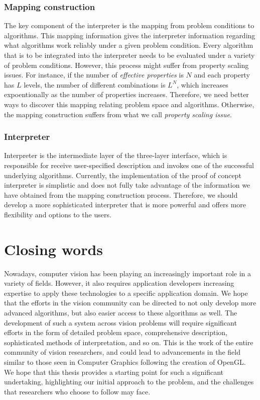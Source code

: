 \subsubsection{Mapping construction}
The key component of the interpreter is the mapping from problem conditions to algorithms. This mapping information gives the interpreter information regarding what algorithms work reliably under a given problem condition. Every algorithm that is to be integrated into the interpreter needs to be evaluated under a variety of problem conditions. However, this process might suffer from property scaling issues. For instance, if the number of \textit{effective properties} is $N$ and each property has $L$ levels, the number of different combinations is $L^N$, which increases expoentionally as the number of properties increases. Therefore, we need better ways to discover this mapping relating problem space and algorithms. Otherwise, the mapping construction suffers from what we call \textit{property scaling issue}.

\subsubsection{Interpreter}
Interpreter is the intermediate layer of the three-layer interface, which is responsible for receive user-specified description and invokes one of the successful underlying algorithms. Currently, the implementation of the proof of concept interpreter is simplistic and does not fully take advantage of the information we have obtained from the mapping construction process. Therefore, we should develop a more sophisticated interpreter that is more powerful and offers more flexibility and options to the users.

\section{Closing words}
Nowadays, computer vision has been playing an increasingly important role in a variety of fields. However, it also requires application developers increasing expertise to apply these technologies to a specific application domain. We hope that the efforts in the vision community can be directed to not only develop more advanced algorithms, but also easier access to these algorithms as well. The development of such a system across vision problems will require significant efforts in the form of detailed problem space, comprehensive description, sophisticated methods of interpretation, and so on. This is the work of the entire community of vision researchers, and could lead to advancements in the field similar to those seen in Computer Graphics following the creation of OpenGL. We hope that this thesis provides a starting point for such a significant undertaking, highlighting our initial approach to the problem, and the challenges that researchers who choose to follow may face.
